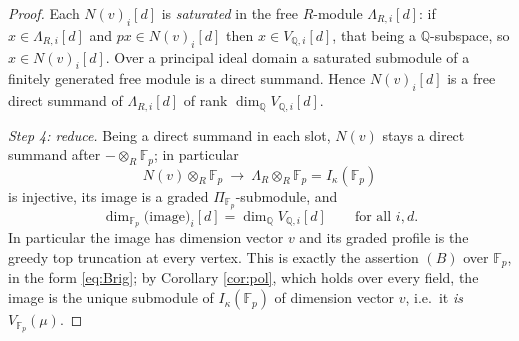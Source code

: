 \documentclass[reqno]{amsart}
\theoremstyle{plain}
\theoremstyle{definition}
\newcommand{\ka}{\kappa}
\newcommand{\Pia}{\Pi}
\begin{document}
\begin{proof}
Each $N(v)_i[d]$ is \emph{saturated} in the free $R$-module
$\Lambda_{R,i}[d]$: if $x\in\Lambda_{R,i}[d]$ and $px\in N(v)_i[d]$ then
$x\in V_{\mathbb{Q},i}[d]$, that being a $\mathbb{Q}$-subspace, so
$x\in N(v)_i[d]$.  Over a principal ideal domain a saturated submodule of a
finitely generated free module is a direct summand.  Hence $N(v)_i[d]$ is a
free direct summand of $\Lambda_{R,i}[d]$ of rank
$\dim_{\mathbb{Q}}V_{\mathbb{Q},i}[d]$.

\smallskip\noindent
\emph{Step 4: reduce.}  Being a direct summand in each slot, $N(v)$ stays a
direct summand after $-\otimes_R\mathbb{F}_p$; in particular
\[
   N(v)\otimes_R\mathbb{F}_p\ \longrightarrow\
   \Lambda_R\otimes_R\mathbb{F}_p=I_\ka(\mathbb{F}_p)
\]
is injective, its image is a graded $\Pia_{\mathbb{F}_p}$-submodule, and
\begin{equation}\label{eq:specdims}
   \dim_{\mathbb{F}_p}\bigl(\text{image}\bigr)_i[d]
   =\dim_{\mathbb{Q}}V_{\mathbb{Q},i}[d]\qquad\text{for all } i,d .
\end{equation}
In particular the image has dimension vector $v$ and its graded profile is the
greedy top truncation at every vertex.  This is exactly the assertion $(B)$
over $\mathbb{F}_p$, in the form \eqref{eq:Brig}; by Corollary \ref{cor:pol},
which holds over every field, the image is the unique submodule of
$I_\ka(\mathbb{F}_p)$ of dimension vector $v$, i.e.\ it \emph{is}
$V_{\mathbb{F}_p}(\mu)$.


\end{proof}
\end{document}
